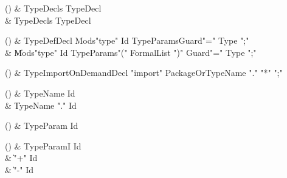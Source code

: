 \begin{bbgrammarappendix}

() & TypeDecls \label{prod:TypeDecls}  \: TypeDecl  \\

 &    \| TypeDecls TypeDecl \\

\end{bbgrammarappendix}

\begin{bbgrammarappendix}

() & TypeDefDecl \label{prod:TypeDefDecl}  \: Mods\opt \xcd"type" Id TypeParams\opt Guard\opt \xcd"=" Type \xcd";"  \\

 &    \| Mods\opt \xcd"type" Id TypeParams\opt \xcd"(" FormalList \xcd")" Guard\opt \xcd"=" Type \xcd";" \\

\end{bbgrammarappendix}

\begin{bbgrammarappendix}

() & TypeImportOnDemandDecl \label{prod:TypeImportOnDemandDecl}  \: \xcd"import" PackageOrTypeName \xcd"." \xcd"*" \xcd";"  \\


\end{bbgrammarappendix}

\begin{bbgrammarappendix}

() & TypeName \label{prod:TypeName}  \: Id  \\

 &    \| TypeName \xcd"." Id \\

\end{bbgrammarappendix}

\begin{bbgrammarappendix}

() & TypeParam \label{prod:TypeParam}  \: Id  \\


\end{bbgrammarappendix}

\begin{bbgrammarappendix}

() & TypeParamI \label{prod:TypeParamI}  \: Id  \\

 &    \| \xcd"+" Id \\
 &    \| \xcd"-" Id \\

\end{bbgrammarappendix}

